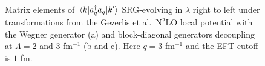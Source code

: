 \documentclass[preprintnumbers,floatfix,aps,prc,preprint,nofootinbib]{revtex4-1}
\begin{document}
\begin{figure}[H]
	\centering
	

	\caption{Matrix elements of $\mel{k}{a^{\dagger}_q a_q}{k'}$ SRG-evolving in $\lambda$ right to left under transformations from the Gezerlis et al.~N$^2$LO local potential with the Wegner generator (a) and block-diagonal generators decoupling at $\Lambda=2$ and $3$ fm$^{-1}$ (b and c). Here $q=3$ fm$^{-1}$ and the EFT cutoff is $1$ fm.}
	\label{momentum_projection_contours_q3,00_kvnn222}
\end{figure}
\end{document}
